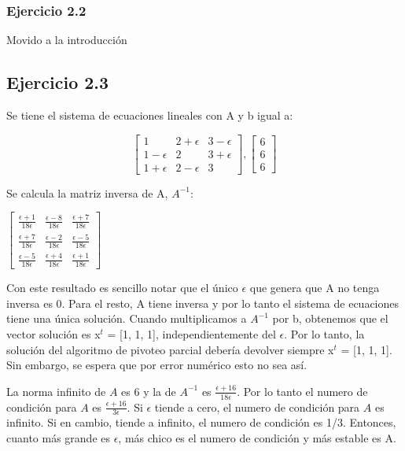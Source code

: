 \subsubsection{Ejercicio 2.2}

Movido a la introducción

\fi





\subsection{Ejercicio 2.3}

Se tiene el sistema de ecuaciones lineales con A y b igual a:

\[ \begin{bmatrix}
1 & 2+\epsilon & 3-\epsilon\\
1-\epsilon & 2 & 3+\epsilon\\
1+\epsilon & 2-\epsilon & 3
\end{bmatrix} ,
\begin{bmatrix}
6\\
6\\
6
\end{bmatrix}\]

Se calcula la matriz inversa de A, $A^{-1}$:
\begin{center}
$\begin{bmatrix}
\frac{\epsilon+1}{18\epsilon} & \frac{\epsilon-8}{18\epsilon} & \frac{\epsilon+7}{18\epsilon}\\
\frac{\epsilon+7}{18\epsilon} & \frac{\epsilon-2}{18\epsilon} & \frac{\epsilon-5}{18\epsilon}\\
\frac{\epsilon-5}{18\epsilon} & \frac{\epsilon+4}{18\epsilon} & \frac{\epsilon+1}{18\epsilon}
\end{bmatrix}$
\end{center}

Con este resultado es sencillo notar que el único $\epsilon$ que genera que A no tenga inversa es 0. Para el resto, A tiene inversa y por lo tanto el sistema de ecuaciones tiene una única solución. Cuando multiplicamos a $A^{-1}$ por b, obtenemos que el vector solución es x$^t$ = [1, 1, 1], independientemente del $\epsilon$. Por lo tanto, la solución del algoritmo de pivoteo parcial debería devolver siempre x$^t$ = [1, 1, 1]. Sin embargo, se espera que por error numérico esto no sea así. 

La norma infinito de $A$ es 6 y la de $A^{-1}$ es $\frac{\epsilon+16}{18\epsilon}$. Por lo tanto el numero de condición para $A$ es $\frac{\epsilon+16}{3\epsilon}$. Si $\epsilon$ tiende a cero, el numero de condición para $A$ es infinito. Si en cambio, tiende a infinito, el numero de condición es 1/3. Entonces, cuanto más grande es $\epsilon$, más chico es el numero de condición y más estable es A. 

